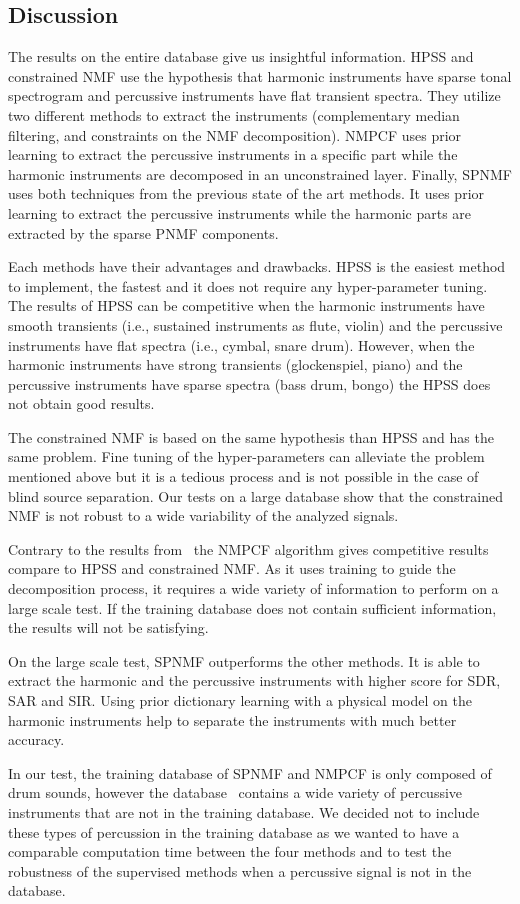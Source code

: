 \subsection{Discussion}
\label{discu}

The results on the entire database give us insightful information.
HPSS and constrained NMF use the hypothesis that harmonic instruments have sparse tonal spectrogram and percussive instruments have flat transient spectra. They utilize two different methods to extract the instruments (complementary median filtering, and constraints on the NMF decomposition).
NMPCF uses prior learning to extract the percussive instruments in a specific part while the harmonic instruments are decomposed in an unconstrained layer. 
Finally, SPNMF uses both techniques from the previous state of the art methods. It uses prior learning to extract the percussive instruments while the harmonic parts are extracted by the sparse PNMF components.



Each methods have their advantages and  drawbacks. HPSS is the easiest method to implement, the fastest and it does not require any hyper-parameter tuning. The results of HPSS can be competitive when the harmonic instruments have smooth transients (i.e., sustained instruments as flute, violin) and the percussive instruments have flat spectra (i.e., cymbal, snare drum). However, when the harmonic instruments have strong transients (glockenspiel, piano) and the percussive instruments have sparse spectra (bass drum, bongo) the HPSS does not obtain good results. 

The constrained NMF is based on the same hypothesis than HPSS and has the same problem. Fine tuning of the hyper-parameters can alleviate the problem mentioned above but it is a tedious process and is not possible in the case of blind source separation. Our tests on a large database show that the constrained NMF is not robust to a wide variability of the analyzed signals.

Contrary to the results from~\cite{canadas2014percussive} the NMPCF algorithm gives competitive results compare to HPSS and constrained NMF. As it uses training to guide the decomposition process, it requires a wide variety of information to perform on a large scale test. If the training database does not contain sufficient information, the results will not be satisfying. 

On the large scale test, SPNMF outperforms the other methods. It is able to extract the harmonic and the percussive instruments with higher score for SDR, SAR and SIR. Using prior dictionary learning with a physical model on the harmonic instruments help to separate the instruments with much better accuracy.

In our test, the training database of SPNMF and NMPCF is only composed of drum sounds, however the database~\cite{bittner2014medleydb} contains a wide variety of percussive instruments that are not in the training database. We decided not to include these types of percussion in the training database as we wanted to have a comparable computation time between the four methods and to test the robustness of the supervised methods when a percussive signal is not in the database. 

